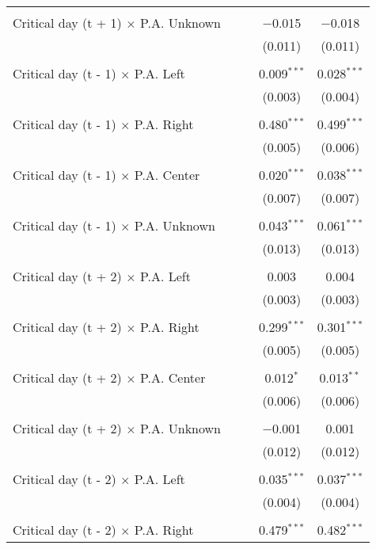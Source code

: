 \documentclass[
]{article}
\begin{document}
\begin{table}[!htbp]
{\begin{tabular}{@{\extracolsep{5pt}}lcccc}
  & & & & \\ 
 Critical day (t + 1) $\times$ P.A. Unknown &  &  & $-$0.015 & $-$0.018 \\ 
  &  &  & (0.011) & (0.011) \\ 
  & & & & \\ 
 Critical day (t - 1) $\times$ P.A. Left &  &  & 0.009$^{***}$ & 0.028$^{***}$ \\ 
  &  &  & (0.003) & (0.004) \\ 
  & & & & \\ 
 Critical day (t - 1) $\times$ P.A. Right &  &  & 0.480$^{***}$ & 0.499$^{***}$ \\ 
  &  &  & (0.005) & (0.006) \\ 
  & & & & \\ 
 Critical day (t - 1) $\times$ P.A. Center &  &  & 0.020$^{***}$ & 0.038$^{***}$ \\ 
  &  &  & (0.007) & (0.007) \\ 
  & & & & \\ 
 Critical day (t - 1) $\times$ P.A. Unknown &  &  & 0.043$^{***}$ & 0.061$^{***}$ \\ 
  &  &  & (0.013) & (0.013) \\ 
  & & & & \\ 
 Critical day (t + 2) $\times$ P.A. Left &  &  & 0.003 & 0.004 \\ 
  &  &  & (0.003) & (0.003) \\ 
  & & & & \\ 
 Critical day (t + 2) $\times$ P.A. Right &  &  & 0.299$^{***}$ & 0.301$^{***}$ \\ 
  &  &  & (0.005) & (0.005) \\ 
  & & & & \\ 
 Critical day (t + 2) $\times$ P.A. Center &  &  & 0.012$^{*}$ & 0.013$^{**}$ \\ 
  &  &  & (0.006) & (0.006) \\ 
  & & & & \\ 
 Critical day (t + 2) $\times$ P.A. Unknown &  &  & $-$0.001 & 0.001 \\ 
  &  &  & (0.012) & (0.012) \\ 
  & & & & \\ 
 Critical day (t - 2) $\times$ P.A. Left &  &  & 0.035$^{***}$ & 0.037$^{***}$ \\ 
  &  &  & (0.004) & (0.004) \\ 
  & & & & \\ 
 Critical day (t - 2) $\times$ P.A. Right &  &  & 0.479$^{***}$ & 0.482$^{***}$ \\ 

\end{tabular}}
\end{table}
\end{document}
